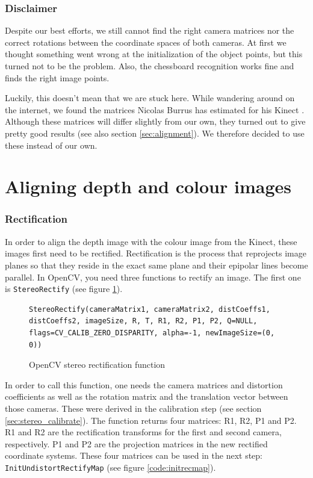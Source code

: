 \subsubsection{Disclaimer}

Despite our best efforts, we still cannot find the right camera matrices nor the
correct rotations between the coordinate spaces of both cameras. At first we
thought something went wrong at the initialization of the object points, but
this turned not to be the problem. Also, the chessboard recognition works fine
and finds the right image points. 

Luckily, this doesn't mean that we are stuck here. While wandering around on the
internet, we found the matrices Nicolas Burrus has estimated for his Kinect
\cite{RGBDEMO}. Although these matrices will differ slightly from our own, they
turned out to give pretty good results (see also section \ref{sec:alignment}).
We therefore decided to use these instead of our own.


\section{Aligning depth and colour images}

\subsubsection{Rectification}

In order to align the depth image with the colour image from the Kinect, these
images first need to be rectified. Rectification is the process that reprojects
image planes so that they reside in the exact same plane and their epipolar
lines become parallel. In OpenCV, you need three functions to rectify an image.
The first one is \verb|StereoRectify| (see figure \ref{code:stereorectify}).

\begin{figure}[H]
\begin{lstlisting}
StereoRectify(cameraMatrix1, cameraMatrix2, distCoeffs1, distCoeffs2, imageSize, R, T, R1, R2, P1, P2, Q=NULL, flags=CV_CALIB_ZERO_DISPARITY, alpha=-1, newImageSize=(0, 0))
\end{lstlisting}
\caption{OpenCV stereo rectification function}
\label{code:stereorectify}
\end{figure}

In order to call this function, one needs the camera matrices and distortion
coefficients as well as the rotation matrix and the translation vector between
those cameras. These were derived in the calibration step (see section
\ref{sec:stereo_calibrate}). The function returns four matrices: R1, R2, P1 and
P2. R1 and R2 are the rectification transforms for the first and second camera,
respectively. P1 and P2 are the projection matrices in the new rectified
coordinate systems. These four matrices can be used in the next step:
\verb|InitUndistortRectifyMap| (see figure \ref{code:initrecmap}).

